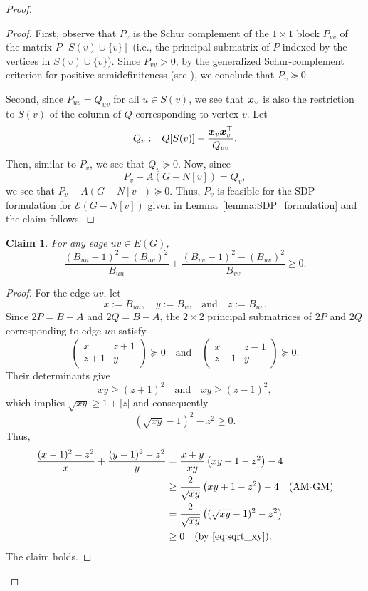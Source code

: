 \documentclass[11pt]{article}
\theoremstyle{plain}
\newtheorem{claim}{Claim}[section]
\numberwithin{equation}{section}
\def\x{\mbox{\boldmath $x$}}
\begin{document}
\begin{proof}
\begin{proof}
First, observe that $P_v$ is the Schur complement of the $1\times 1$ block $P_{vv}$ of the matrix $P[S(v)\cup \{v\}]$ (i.e., the principal submatrix of $P$ indexed by the vertices in $S(v)\cup \{v\}$). Since $P_{vv}>0$, by the generalized Schur-complement criterion for positive semidefiniteness (see \cite[Theorem 1.20]{Zhang_2005_Schur}), we conclude that $P_v\succeq 0$. 

Second, since $P_{uv} = Q_{uv}$ for all $u\in S(v)$, we see that $\x_v$ is also the restriction to $S(v)$ of the column of $Q$ corresponding to vertex $v$. Let 
\[ Q_v: = Q[S(v)] - \frac{\x_v\x_v^\top}{Q_{vv}}. \]
Then, similar to $P_v$, we see that $Q_v\succeq 0$. Now, since
\[ P_v - A(G-N[v]) = Q_v,\]
we see that $P_v-A(G-N[v])\succeq 0$. Thus, $P_v$ is feasible for the SDP formulation for $\mathcal{E}(G-N[v])$ given in Lemma~\ref{lemma:SDP_formulation} and the claim follows.
\end{proof}

\begin{claim}\label{claim:B_edge_inequality} For any edge $uv\in E(G)$, 
\[ \frac{(B_{uu}-1)^2-(B_{uv})^2}{B_{uu}} + \frac{(B_{vv}-1)^2-(B_{uv})^2}{B_{vv}}\ge 0.\]
\end{claim}

\begin{proof} For the edge $uv$, let 
\[x := B_{uu},\quad y := B_{vv}\quad \text{and}\quad z:=B_{uv}.\] 
Since $2P = B + A$ and $2Q = B-A$, the $2\times 2$ principal submatrices of $2P$ and $2Q$ corresponding to edge $uv$ satisfy
\[ 
\begin{pmatrix}
x & z+1\\
z+1& y
\end{pmatrix} \succeq 0 \quad \text{and}\quad 
\begin{pmatrix}
x & z-1\\
z-1 & y
\end{pmatrix} \succeq 0.\]
Their determinants give
\[xy\ge (z+1)^2 \quad \text{and}\quad xy\ge (z-1)^2,\]
which implies $ \sqrt{xy}\ge 1 + |z|$ and consequently
\begin{equation}\label{eq:sqrt_xy}
  (\sqrt{xy}-1)^2 - z^2\ge 0.
\end{equation}
Thus, 
\begin{align*}
    \frac{(x-1)^2 - z^2}{x} + \frac{(y-1)^2-z^2}{y}& = \frac{x+y}{xy}\left(xy +1 -z^2\right) - 4\\
    & \ge \frac{2}{\sqrt{xy}}\left(xy +1 -z^2\right) - 4 \quad (\text{AM-GM})\\
    & = \frac{2}{\sqrt{xy}}\left((\sqrt{xy} - 1)^2 -z^2\right)\\
    & \ge 0 \quad (\text{by \eqref{eq:sqrt_xy}}).
\end{align*}
The claim holds.
\end{proof}


\end{proof}
\end{document}
